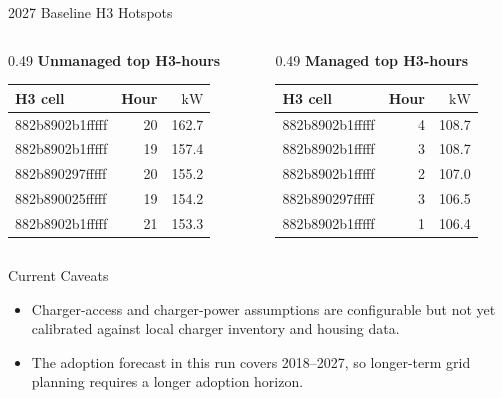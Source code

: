 \documentclass[aspectratio=169]{beamer}
\newcommand{\kw}{\mathrm{kW}}
\begin{document}
\begin{frame}{2027 Baseline H3 Hotspots}
\small
\begin{columns}[T,totalwidth=\linewidth]
\begin{column}{0.49\linewidth}
\textbf{Unmanaged top H3-hours}

\vspace{0.3em}
\scriptsize
\begin{tabular}{lrr}
\toprule
\textbf{H3 cell} & \textbf{Hour} & \textbf{\(\kw\)} \\
\midrule
882b8902b1fffff & 20 & 162.7 \\
882b8902b1fffff & 19 & 157.4 \\
882b890297fffff & 20 & 155.2 \\
882b890025fffff & 19 & 154.2 \\
882b8902b1fffff & 21 & 153.3 \\
\bottomrule
\end{tabular}
\end{column}
\begin{column}{0.49\linewidth}
\textbf{Managed top H3-hours}

\vspace{0.3em}
\scriptsize
\begin{tabular}{lrr}
\toprule
\textbf{H3 cell} & \textbf{Hour} & \textbf{\(\kw\)} \\
\midrule
882b8902b1fffff & 4 & 108.7 \\
882b8902b1fffff & 3 & 108.7 \\
882b8902b1fffff & 2 & 107.0 \\
882b890297fffff & 3 & 106.5 \\
882b8902b1fffff & 1 & 106.4 \\
\bottomrule
\end{tabular}
\end{column}
\end{columns}
\end{frame}

\begin{frame}{Current Caveats}
\small
\begin{itemize}
  \item Charger-access and charger-power assumptions are configurable but not yet calibrated against local charger inventory and housing data.
  \item The adoption forecast in this run covers 2018--2027, so longer-term grid planning requires a longer adoption horizon.
\end{itemize}
\end{frame}
\end{document}
